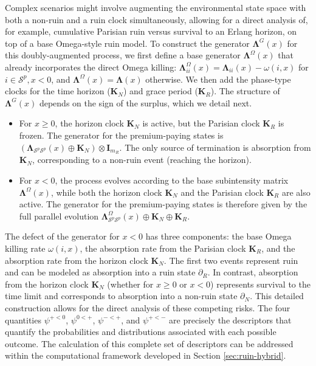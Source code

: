 \documentclass[11pt]{article}
\numberwithin{table}{section}
\numberwithin{figure}{section}
\numberwithin{equation}{section}
\newcommand{\1}{{\mathbf 1}}
\newcommand{\0}{\mat{0}}
\begin{document}
Complex scenarios might involve augmenting the environmental state space with both a non-ruin and a ruin clock simultaneously, allowing for a direct analysis of, for example, cumulative Parisian ruin versus survival to an Erlang horizon, on top of a base Omega-style ruin model. To construct the generator \(\bm{\Lambda}^G(x)\) for this doubly-augmented process, we first define a base generator \(\bm{\Lambda}^\Omega(x)\) that already incorporates the direct Omega killing: \(\bm{\Lambda}^\Omega_{ii}(x) = \bm{\Lambda}_{ii}(x) - \omega(i,x)\) for \(i \in \mathcal{S}^p, x<0\), and \(\bm{\Lambda}^\Omega(x) = \bm{\Lambda}(x)\) otherwise. We then add the phase-type clocks for the time horizon (\(\bm{K}_N\)) and grace period (\(\bm{K}_R\)). The structure of \(\bm{\Lambda}^G(x)\) depends on the sign of the surplus, which we detail next.
\begin{itemize}
    \item For \(x \ge 0\), the horizon clock \(\bm{K}_N\) is active, but the Parisian clock \(\bm{K}_R\) is frozen. The generator for the premium-paying states is \(\left(\bm{\Lambda}_{\mathcal{S}^p\mathcal{S}^p}(x) \oplus \bm{K}_N\right) \otimes \bm{I}_{m_R}\). The only source of termination is absorption from \(\bm{K}_N\), corresponding to a non-ruin event (reaching the horizon).
    \item For \(x < 0\), the process evolves according to the base subintensity matrix \(\bm{\Lambda}^\Omega(x)\), while both the horizon clock \(\bm{K}_N\) and the Parisian clock \(\bm{K}_R\) are also active. The generator for the premium-paying states is therefore given by the full parallel evolution \(\bm{\Lambda}_{\mathcal{S}^p\mathcal{S}^p}^\Omega(x) \oplus \bm{K}_N \oplus \bm{K}_R\).
\end{itemize}
The defect of the generator for \(x<0\) has three components: the base Omega killing rate \(\omega(i,x)\), the absorption rate from the Parisian clock \(\bm{K}_R\), and the absorption rate from the horizon clock \(\bm{K}_N\). The first two events represent ruin and can be modeled as absorption into a  ruin state \(\partial_R\). In contrast, absorption from the horizon clock \(\bm{K}_N\) (whether for \(x \ge 0\) or \(x < 0\)) represents survival to the time limit and corresponds to absorption into a non-ruin state \(\partial_N\). This detailed construction allows for the direct analysis of these competing risks. The four quantities \(\psi^{+<0}\), \(\psi^{0<+}\), \(\psi^{-<+}\), and \(\psi^{+<-}\) are precisely the descriptors that quantify the probabilities and distributions associated with each possible outcome. The calculation of this complete set of descriptors can be addressed within the computational framework developed in Section \ref{sec:ruin-hybrid}.
\end{document}
